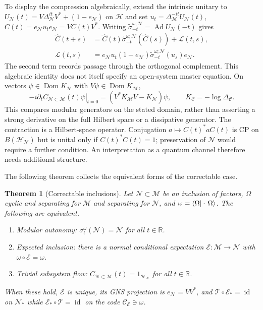 \documentclass[a4paper,11pt]{article}
\newtheorem{theorem}{Theorem}
\theoremstyle{definition}
\newcommand{\nn}{\nonumber}
\newcommand{\mN}{\mathcal{N}}
\newcommand{\mH}{\mathcal{H}}
\newcommand{\mM}{\mathcal{M}}
\newcommand{\mE}{\mathcal{E}}
\begin{document}
To display the compression algebraically, extend the intrinsic unitary to
$U_{\mN}(t)=V\Delta_{\mN}^{it}V^*+(1-e_{\mN})$ on $\mathcal H$ and set
$u_t=\Delta_{\mM}^{-it}U_{\mN}(t)$, $\widehat C(t)=e_{\mN}u_te_{\mN}=VC(t)V^*$.
Writing $\widetilde\sigma^{\omega;\mN}_{-t}=\operatorname{Ad}U_{\mN}(-t)$ gives
\begin{align}
 \widehat C(t+s)&=\widehat C(t)\widetilde\sigma^{\omega;\mN}_{-t}(\widehat C(s))
                  +\mathcal L(t,s),\nn\\
 \mathcal L(t,s)&=e_{\mN}u_t(1-e_{\mN})\widetilde\sigma^{\omega;\mN}_{-t}(u_s)e_{\mN}.
\end{align}
The second term records passage through the orthogonal complement. This algebraic
identity does not itself specify an open-system master equation.
On vectors $\psi\in\operatorname{Dom}K_{\mN}$ with $V\psi\in\operatorname{Dom}K_{\mM}$,
\begin{equation}
 -i\left.\partial_t C_{\mN\subset\mM}(t)\psi\right|_{t=0}
 =(V^*K_{\mM}V-K_{\mN})\psi,\qquad K_{\mathcal C}=-\log\Delta_{\mathcal C}.
\end{equation}
This compares modular generators on the stated domain, rather than asserting
a strong derivative on the full Hilbert space or a dissipative generator.
The contraction is a Hilbert-space operator. Conjugation
$a\mapsto C(t)^*aC(t)$ is CP on $B(\mH_{\mN})$ but is unital only if
$C(t)^*C(t)=1$; preservation of $\mN$ would require a further condition.
An interpretation as a quantum channel therefore needs additional structure.

The following theorem collects the equivalent forms of the correctable case.
\begin{theorem}[Correctable inclusions]\label{thm:correctable}
Let $\mN\subset\mM$ be an inclusion of factors, $\Omega$ cyclic and separating for $\mM$ and separating for $\mN$, and $\omega=\braket{\Omega|\cdot\,\Omega}$. The following are equivalent.
\begin{enumerate}
 \item[\rm(i)] \emph{Modular autonomy:} $\sigma^{\omega}_t(\mN)=\mN$ for all $t\in\mathbb R$.
 \item[\rm(ii)] \emph{Expected inclusion:} there is a normal conditional expectation $\mE:\mM\to\mN$ with $\omega\circ\mE=\omega$.
 \item[\rm(iii)] \emph{Trivial subsystem flow:} $C_{\mN\subset\mM}(t)=1_{\mH_{\mN}}$ for all $t\in\mathbb R$.
\end{enumerate}
When these hold, $\mE$ is unique, its GNS projection is $e_{\mN}=VV^*$, and $\mathcal T\circ\mE_*=\operatorname{id}$ on $\mN_*$ while $\mE_*\circ\mathcal T=\operatorname{id}$ on the code $\mathcal C_{\mE}\ni\omega$.
\end{theorem}
\end{document}
